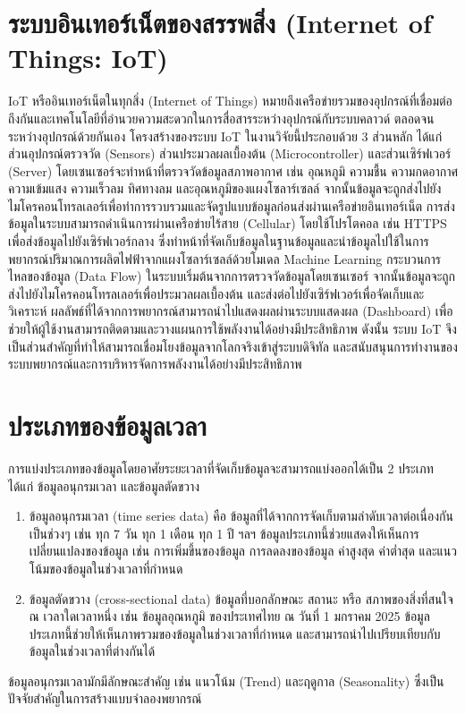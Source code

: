 \section{ระบบอินเทอร์เน็ตของสรรพสิ่ง (Internet of Things: IoT)}
\hspace{\parindent}IoT หรืออินเทอร์เน็ตในทุกสิ่ง (Internet of Things) หมายถึงเครือข่ายรวมของอุปกรณ์ที่เชื่อมต่อถึงกันและเทคโนโลยีที่อำนวยความสะดวกในการสื่อสารระหว่างอุปกรณ์กับระบบคลาวด์ ตลอดจนระหว่างอุปกรณ์ด้วยกันเอง
โครงสร้างของระบบ IoT ในงานวิจัยนี้ประกอบด้วย 3 ส่วนหลัก ได้แก่ ส่วนอุปกรณ์ตรวจวัด (Sensors) ส่วนประมวลผลเบื้องต้น (Microcontroller) และส่วนเซิร์ฟเวอร์ (Server) โดยเซนเซอร์จะทำหน้าที่ตรวจวัดข้อมูลสภาพอากาศ เช่น อุณหภูมิ ความชื้น ความกดอากาศ ความเข้มแสง ความเร็วลม ทิศทางลม และอุณหภูมิของแผงโซลาร์เซลล์ จากนั้นข้อมูลจะถูกส่งไปยังไมโครคอนโทรลเลอร์เพื่อทำการรวบรวมและจัดรูปแบบข้อมูลก่อนส่งผ่านเครือข่ายอินเทอร์เน็ต
การส่งข้อมูลในระบบสามารถดำเนินการผ่านเครือข่ายไร้สาย (Cellular) โดยใช้โปรโตคอล เช่น HTTPS เพื่อส่งข้อมูลไปยังเซิร์ฟเวอร์กลาง ซึ่งทำหน้าที่จัดเก็บข้อมูลในฐานข้อมูลและนำข้อมูลไปใช้ในการพยากรณ์ปริมาณการผลิตไฟฟ้าจากแผงโซลาร์เซลล์ด้วยโมเดล Machine Learning
กระบวนการไหลของข้อมูล (Data Flow) ในระบบเริ่มต้นจากการตรวจวัดข้อมูลโดยเซนเซอร์ จากนั้นข้อมูลจะถูกส่งไปยังไมโครคอนโทรลเลอร์เพื่อประมวลผลเบื้องต้น และส่งต่อไปยังเซิร์ฟเวอร์เพื่อจัดเก็บและวิเคราะห์ ผลลัพธ์ที่ได้จากการพยากรณ์สามารถนำไปแสดงผลผ่านระบบแสดงผล (Dashboard) เพื่อช่วยให้ผู้ใช้งานสามารถติดตามและวางแผนการใช้พลังงานได้อย่างมีประสิทธิภาพ
ดังนั้น ระบบ IoT จึงเป็นส่วนสำคัญที่ทำให้สามารถเชื่อมโยงข้อมูลจากโลกจริงเข้าสู่ระบบดิจิทัล 
และสนับสนุนการทำงานของระบบพยากรณ์และการบริหารจัดการพลังงานได้อย่างมีประสิทธิภาพ \cite{aws_iot}




\section{ประเภทของข้อมูลเวลา}
\hspace{\parindent}การแบ่งประเภทของข้อมูลโดยอาศัยระยะเวลาที่จัดเก็บข้อมูลจะสามารถแบ่งออกได้เป็น 2 ประเภท ได้แก่ ข้อมูลอนุกรมเวลา และข้อมูลตัดขวาง
\begin{enumerate}
  \item ข้อมูลอนุกรมเวลา (time series data)
คือ ข้อมูลที่ได้จากการจัดเก็บตามลำดับเวลาต่อเนื่องกันเป็นช่วงๆ เช่น ทุก 7 วัน ทุก 1 เดือน ทุก 1 ปี ฯลฯ ข้อมูลประเภทนี้ช่วยแสดงให้เห็นการเปลี่ยนแปลงของข้อมูล
เช่น การเพิ่มขึ้นของข้อมูล การลดลงของข้อมูล ค่าสูงสุด ค่าต่ำสุด และแนวโน้มของข้อมูลในช่วงเวลาที่กำหนด
  \item ข้อมูลตัดขวาง (cross-sectional data) ข้อมูลที่บอกลักษณะ สถานะ หรือ สภาพของสิ่งที่สนใจ ณ เวลาใดเวลาหนึ่ง เช่น ข้อมูลอุณหภูมิ ของประเทศไทย ณ วันที่ 1 มกราคม 2025 ข้อมูลประเภทนี้ช่วยให้เห็นภาพรวมของข้อมูลในช่วงเวลาที่กำหนด และสามารถนำไปเปรียบเทียบกับข้อมูลในช่วงเวลาที่ต่างกันได้
\end{enumerate}
\hspace{\parindent}ข้อมูลอนุกรมเวลามักมีลักษณะสำคัญ เช่น แนวโน้ม (Trend) และฤดูกาล (Seasonality) 
ซึ่งเป็นปัจจัยสำคัญในการสร้างแบบจำลองพยากรณ์ \cite{kanit_data}

